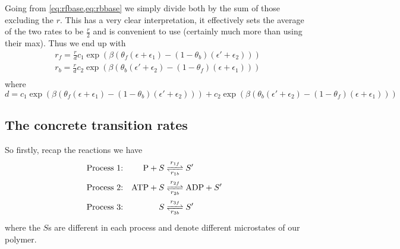 \documentclass[11pt]{article}
\begin{document}
\begin{tcolorbox}
	Going from \cref{eq:rfbase,eq:rbbase} we simply divide both by the sum of those excluding the $r$.
	This has a very clear interpretation, it effectively sets the average of the two rates to be $\frac{r}{2}$ and is convenient to use (certainly much more than using their max).
	Thus we end up with
	\begin{align}
		 & r_f = \frac{r}{d} c_1 \exp(\beta(\theta_f(\epsilon+\epsilon_1)-(1-\theta_b)(\epsilon'+\epsilon_2))) \\
		 & r_b = \frac{r}{d} c_2 \exp(\beta(\theta_b(\epsilon'+\epsilon_2)-(1-\theta_f)(\epsilon+\epsilon_1))) \\
	\end{align}
    where
	\begin{equation}
		d = c_1 \exp(\beta(\theta_f(\epsilon+\epsilon_1)-(1-\theta_b)(\epsilon'+\epsilon_2))) + c_2 \exp(\beta(\theta_b(\epsilon'+\epsilon_2)-(1-\theta_f)(\epsilon+\epsilon_1)))
	\end{equation}
\end{tcolorbox}

\subsection{The concrete transition rates}
So firstly, recap the reactions we have
\begin{align}
	\text{Process 1:} &  & \ce{P + $S$   & <=>[$r_{1f}$][$r_{1b}$] $S'$}       \\
	\text{Process 2:} &  & \ce{ATP + $S$ & <=>[$r_{2f}$][$r_{2b}$] ADP + $S'$} \\
	\text{Process 3:} &  & \ce{$S$       & <=>[$r_{3f}$][$r_{3b}$] $S'$}
\end{align}
where the $S$s are different in each process and denote different microstates of our polymer.
\end{document}
